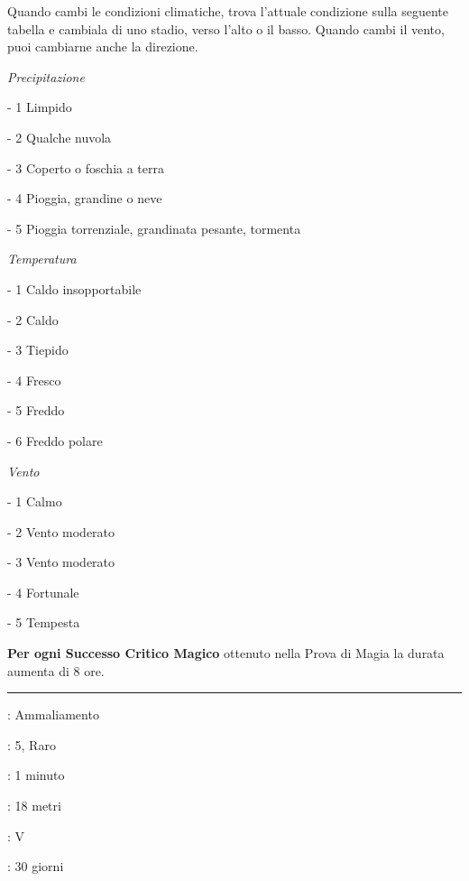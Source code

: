 \begin{multicols}{2}
Quando cambi le condizioni climatiche, trova l'attuale condizione sulla seguente tabella e cambiala di uno stadio, verso l'alto o il basso. Quando cambi il vento, puoi cambiarne anche la direzione.

\medskip

\emph{Precipitazione}

- 1 Limpido

- 2 Qualche nuvola

- 3 Coperto o foschia a terra

- 4 Pioggia, grandine o neve

- 5 Pioggia torrenziale, grandinata pesante, tormenta

\medskip

\emph{Temperatura}

- 1 Caldo insopportabile

- 2 Caldo

- 3 Tiepido

- 4 Fresco

- 5 Freddo

- 6 Freddo polare

\medskip

\emph{Vento}

- 1 Calmo

- 2 Vento moderato

- 3 Vento moderato

- 4 Fortunale

- 5 Tempesta

\medskip

\textbf{Per ogni Successo Critico Magico} ottenuto nella Prova di Magia la durata aumenta di 8 ore.

\smallskip\noindent\rule{\linewidth}{2pt} \hypertarget{Costrizione}{}\smallskip{}
\noindent
\begin{description}[noitemsep, topsep=0pt, parsep=0pt, partopsep=0pt, leftmargin=0cm, labelwidth=2.8cm]
	\item[\textbf{Lista di Magia}]: Ammaliamento
	\item[\textbf{Livello}]: 5, Raro
	\item[\textbf{T. di Lancio}]: 1 minuto
	\item[\textbf{Gittata}]: 18 metri
	\item[\textbf{Componenti}]: V
	\item[\textbf{Durata}]: 30 giorni
\end{description}


\end{multicols}
